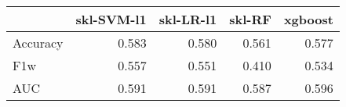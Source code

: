 \begin{tabular}{lrrrr}
\toprule
{} &  skl-SVM-l1 &  skl-LR-l1 &  skl-RF &  xgboost \\
\midrule
Accuracy &       0.583 &      0.580 &   0.561 &    0.577 \\
F1w      &       0.557 &      0.551 &   0.410 &    0.534 \\
AUC      &       0.591 &      0.591 &   0.587 &    0.596 \\
\bottomrule
\end{tabular}
